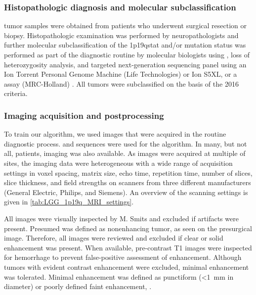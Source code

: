 \subsubsection{Histopathologic diagnosis and molecular subclassification}

\Gls{tumor} samples were obtained from patients who underwent surgical resection or biopsy.
Histopathologic examination was performed by neuropathologists and further molecular subclassification of the \acl{1p19qstat} and/or  mutation status was performed as part of the diagnostic routine by molecular biologists using , loss of heterozygosity analysis, and targeted next-generation sequencing panel using an Ion Torrent Personal Genome Machine (Life Technologies) or Ion S5XL, or a  assay (MRC-Holland) \autocite{dubbink2015molecular, dubbink2016diagnostic, riemenschneider2010molecular, bienkowski2018molecular}.
All \glspl{tumor} were subclassified on the basis of the  2016 criteria.

\subsubsection{Imaging acquisition and postprocessing}

To train our algorithm, we used  images that were acquired in the routine diagnostic process.
 and   sequences were used for the algorithm.
In many, but not all, patients,  imaging was also available.
As images were acquired at multiple of sites, the imaging data were heterogeneous with a wide range of acquisition settings in voxel spacing, matrix size, echo time, repetition time, number of slices, slice thickness, and field strengths on scanners from three different manufacturers (General Electric, Philips, and Siemens).
An overview of the scanning settings is given in \cref{tab:LGG_1p19q_MRI_settings}.

All images were visually inspected by M. Smits and excluded if  artifacts were present.
Presumed  was defined as nonenhancing \gls{tumor}, as seen on the presurgical   image.
Therefore, all  images were reviewed and excluded if clear or solid enhancement was present.
When available, pre-contrast \acrlong{T1} images were inspected for hemorrhage to prevent false-positive assessment of enhancement.
Although \glspl{tumor} with evident contrast enhancement were excluded, minimal enhancement was tolerated.
Minimal enhancement was defined as punctiform (\SI{<1}{\milli\meter} in diameter) or poorly defined faint enhancement, .

